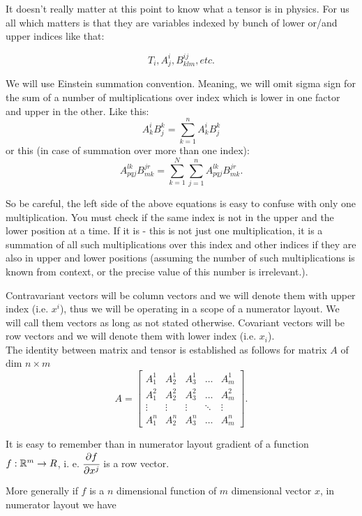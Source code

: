 \documentclass[main.tex]{subfiles}
\begin{document}
It doesn't really matter at this point to know what a tensor is in physics. For us all which matters is that they are variables indexed by bunch of lower or/and upper indices like that:

$$
T_i, A^i_j, B^{ij}_{klm}, etc.
$$


We will use Einstein summation convention. Meaning, we will omit sigma sign for the sum of a number of multiplications over index which is lower in one factor and upper in the other. Like this:
$$
A^i_k B^k_j = \sum_{k = 1}^n A^i_k B^k_j
$$
or this (in case of summation over more than one index):
$$
A_{pqj}^{lk}B^{jr}_{mk} = \sum_{k = 1}^N\sum_{j = 1}^n A_{pqj}^{lk}B^{jr}_{mk}.
$$

So be careful, the left side of the above equations is easy to confuse with only one multiplication. You must check if the same index is not in the upper and the lower position at a time. If it is - this is not just one multiplication, it is a summation of all such multiplications over this index and other indices if they are also in upper and lower positions (assuming the number of such multiplications is known from context, or the precise value of this number is irrelevant.).

Contravariant vectors will be column vectors and we will denote them with upper index (i.e. $x^i$), thus
we will be operating in a scope of a numerator layout. We will call them vectors as long as not stated otherwise. Covariant vectors will be row vectors and we will denote them with lower index (i.e. $x_i$).\\
The identity between matrix and tensor is established as follows for matrix $A$ of dim $n \times m$
\begin{equation}
A = \begin{bmatrix}
    A^1_1 & A^1_2 & A^1_3 & \dots  & A^1_m \\
    A^2_1 & A^2_2 & A^2_3 & \dots  & A^2_m \\
    \vdots & \vdots & \vdots & \ddots & \vdots \\
    A^n_1 & A^n_2 & A^n_3 & \dots  & A^n_m
\end{bmatrix}.
\end{equation}


It is easy to remember than in numerator layout gradient of a function $f:\mathbb{R}^m\to R$, i. e. $\cfrac{\partial f}{\partial x^j}$ is a row vector.

More generally if $f$ is a $n$ dimensional function of $m$ dimensional vector $x$, in numerator layout we have
\end{document}
